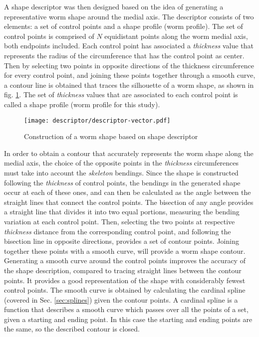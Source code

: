 A shape descriptor was then designed based on the idea of generating a representative
worm shape around the medial axis. The descriptor consists of two 
elements: a set of control points and a shape profile (worm profile). 
The set of control points is comprised of $N$ equidistant points 
along the worm medial axis, both endpoints included.
Each control point has associated a \emph{thickness} value that represents the
radius of the circumference that has the control point as center. Then by selecting two points
in opposite directions of the thickness circumference for every control point, and joining
these points together through a smooth curve, a contour line is obtained that traces
the silhouette of a worm shape, as shown in fig. \ref{fig:descriptor}. 
The set of \emph{thickness} values that are associated to each control point
is called a shape profile (worm profile for this study).

\begin{figure}[h t b p ! H]
 \centering
   \texttt{[image: descriptor/descriptor-vector.pdf]}
 \caption{Construction of a worm shape based on shape descriptor}
 \label{fig:descriptor}
\end{figure}

In order to obtain a contour that accurately represents the worm shape along the 
medial axis, the choice of the opposite points in the \emph{thickness} circumferences 
must take into account the \emph{skeleton} bendings.
Since the shape is constructed following the \emph{thickness} of control points,
the bendings in the generated shape occur at each of these ones, and can then 
be calculated as the angle between the straight lines that connect
the control points. 
The bisection of any angle provides a straight line that divides it
into two equal portions, measuring the bending variation at each control point.
Then, selecting the two points at respective \emph{thickness} distance 
from the corresponding control point, and following the bisection line in opposite directions, provides a set of contour points. Joining 
together these points with a smooth curve, will provide a worm shape contour.\\

Generating a smooth curve around the control points improves the accuracy of the shape
description, compared to tracing straight lines
between the contour points. It provides a good representation
of the shape with considerably fewest control points. The smooth curve
is obtained by calculating the cardinal spline (covered in Sec. \ref{sec:splines}) given the
contour points. A cardinal spline is a function that describes a smooth curve
which passes over all the points of a set, given a starting and ending point. 
In this case
the starting and ending points are the same, so the described contour is closed.\\

